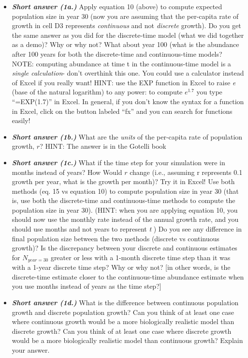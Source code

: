 \documentclass[
]{article}
\begin{document}
\begin{itemize}
\item
  \textbf{\emph{Short answer (1a.)}} Apply equation 10 (above) to
  compute expected population size in year 30 (now you are assuming that
  the per-capita rate of growth in cell D3 represents \emph{continuous}
  and not \emph{discrete} growth). Do you get the same answer as you did
  for the discrete-time model (what we did together as a demo)? Why or
  why not? What about year 100 (what is the abundance after 100 years
  for both the discrete-time and continuous-time models? NOTE: computing
  abundance at time t in the continuous-time model is a \emph{single
  calculation}- don't overthink this one. You could use a calculator
  instead of Excel if you really want! HINT: use the EXP function in
  Excel to raise \emph{e} (base of the natural logarithm) to any power:
  to compute \(e^{1.7}\) you type ``=EXP(1.7)'' in Excel. In general, if
  you don't know the syntax for a function in Excel, click on the button
  labeled ``fx'' and you can search for functions easily!
\item
  \textbf{\emph{Short answer (1b.)}} What are the \emph{units} of the
  per-capita rate of population growth, \(r\)? HINT: The answer is in
  the Gotelli book
\item
  \textbf{\emph{Short answer (1c.)}} What if the time step for your
  simulation were in months instead of years? How Would \(r\) change
  (i.e., assuming r represents 0.1 growth per year, what is the growth
  per month)? Try it in Excel! Use both methods (eq. 15 vs equation 10)
  to compute population size in year 30 (that is, use both the
  discrete-time and continuous-time methods to compute the population
  size in year 30). (HINT: when you are applying equation 10, you should
  now use the monthly rate instead of the annual growth rate, and you
  should use months and not years to represent \emph{t} ) Do you see any
  difference in final population size between the two methods (discrete
  vs continuous growth)? Is the discrepancy between your discrete and
  continuous estimates for \(N_{year=30}\) greater or less with a
  1-month discrete time step than it was with a 1-year discrete time
  step? Why or why not? {[}in other words, is the discrete-time estimate
  closer to the continuous-time abundance estimate when you use months
  instead of years as the time step?{]}
\item
  \textbf{\emph{Short answer (1d.)}} What is the difference between
  continuous population growth and discrete population growth? Can you
  think of at least one case where continuous growth would be a more
  biologically realistic model than discrete growth? Can you think of at
  least one case where discrete growth would be a more biologically
  realistic model than continuous growth? Explain your answer.
\end{itemize}
\end{document}
